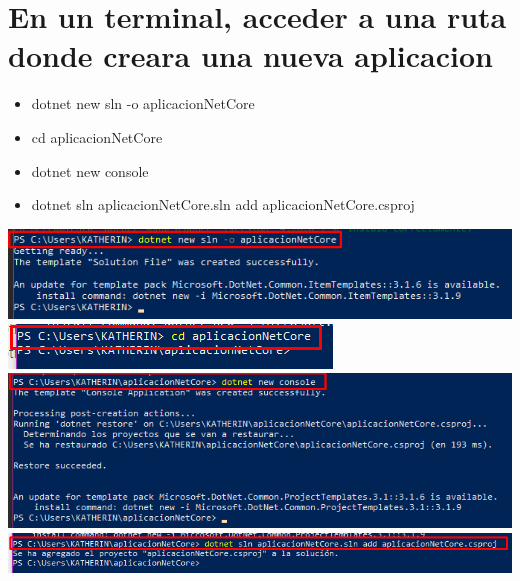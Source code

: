 \section{En un terminal, acceder a una ruta donde creara una nueva aplicacion } 
\begin{itemize}
    \item dotnet new sln -o aplicacionNetCore 
    \item cd aplicacionNetCore 
    \item dotnet new console
    \item dotnet sln aplicacionNetCore.sln add aplicacionNetCore.csproj 
\end{itemize}
\begin{center}
\includegraphics[width=\columnwidth]{images/11}\newline
\includegraphics[width=\columnwidth]{images/12}\newline
\includegraphics[width=\columnwidth]{images/19}\newline
\includegraphics[width=\columnwidth]{images/20}\newline

\end{center}
